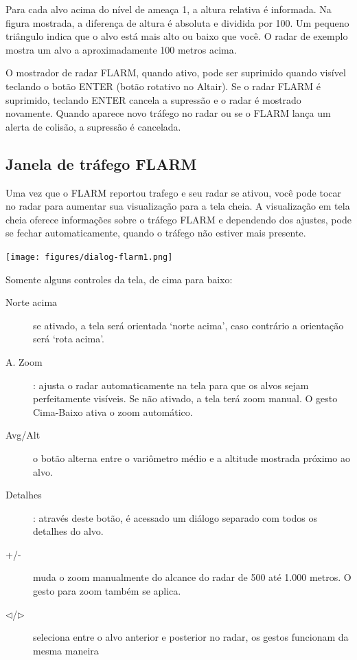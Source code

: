 Para cada alvo acima do nível de ameaça 1, a altura relativa é informada.  Na figura mostrada, a diferença de altura é absoluta e dividida por 100.  Um pequeno triângulo indica que o alvo está mais alto ou baixo que você.  O radar de exemplo mostra um alvo a aproximadamente 100 metros acima.

O mostrador de radar FLARM, quando ativo, pode ser suprimido quando visível teclando o botão ENTER (botão rotativo no Altair).  Se o radar FLARM é suprimido, teclando ENTER cancela a supressão e o radar é mostrado novamente.  Quando aparece novo tráfego no radar ou se o FLARM lança um alerta de colisão, a supressão é cancelada.  



\subsection*{Janela de tráfego FLARM}\label{sec:flarm-traffic}

Uma vez que o FLARM reportou trafego e seu radar se ativou,   você pode tocar no radar para aumentar sua visualização para a tela cheia.  
A visualização em tela cheia oferece informações
sobre o tráfego FLARM e dependendo dos ajustes, pode se fechar automaticamente, quando o tráfego não estiver mais presente. 

\begin{center}
\texttt{[image: figures/dialog-flarm1.png]}
\end{center}

Somente alguns controles da tela, de cima para baixo:
\begin{description}
\item[Norte acima]  se ativado, a tela será orientada ‘norte acima’, caso contrário a orientação será ‘rota acima’.
\item[A. Zoom]   : ajusta o radar automaticamente na tela para que os alvos sejam perfeitamente visíveis.  Se não ativado, a tela terá zoom manual.  O gesto Cima-Baixo ativa o zoom automático.
\item[Avg/Alt]   o botão alterna entre o variômetro médio e a altitude mostrada próximo ao alvo.
\item[Detalhes]   : através deste botão, é acessado um diálogo separado com todos os detalhes do alvo.
\item[+/-]   muda o zoom manualmente do alcance do radar de 500 até 1.000 metros.  O gesto para zoom também se aplica.
\item[$\triangleleft$/$\triangleright$]   seleciona entre o alvo anterior e posterior no radar, os gestos funcionam da mesma maneira
\end{description}

